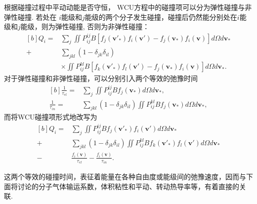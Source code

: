 根据碰撞过程中平动动能是否守恒， WCU方程中的碰撞项可以分为弹性碰撞与非弹性碰撞. 若处在
$ i $能级和$ j $能级的两个分子发生碰撞，碰撞后仍然能分别处在$ i $能级和$ j $能级，则为弹性碰撞, 否则为非弹性碰撞：
\begin{equation*}\label{Chapter1_inelastic_elastic}
\begin{aligned}[b]
Q_i=&\sum_{j}\iint
P_{ij}^{ij}B
\left[f_j(\bm{v}'_{\ast})f_i(\bm{v}')-f_j(\bm{v}_{\ast})f_i(\bm{v})\right]d\Omega
d\bm{v}_\ast\\
+&\sum_{jkl}(1-\delta_{jk}\delta_{il})\\
&\times\iint
P_{ij}^{kl}B
\left[f_k(\bm{v}'_{\ast})f_l(\bm{v}')-f_j(\bm{v}_{\ast})f_i(\bm{v})\right]d\Omega
d\bm{v}_\ast.
\end{aligned}
\end{equation*}
对于弹性碰撞和非弹性碰撞，可以分别引入两个等效的弛豫时间\cite{Morse1964}
\begin{equation*}
\begin{aligned}[b]
\frac{1}{\tau_{el}}=&\sum_{j}\iint
P_{ij}^{ij}B
f_j(\bm{v}_{\ast})d\Omega
d\bm{v}_\ast, \\
\frac{1}{\tau_{in}}=&\sum_{jkl}(1-\delta_{jk}\delta_{il})\iint
P_{ij}^{kl}B
f_j(\bm{v}_{\ast})d\Omega
d\bm{v}_\ast,
\end{aligned}
\end{equation*}
而将WCU碰撞项形式地改写为
\begin{equation*}
\begin{aligned}[b]
Q_i=&\sum_{j}\iint
P_{ij}^{ij}B
f_j(\bm{v}'_{\ast})f_i(\bm{v}')d\Omega
d\bm{v}_\ast
\\
+&\sum_{jkl}(1-\delta_{jk}\delta_{il})\iint
P_{ij}^{kl}B f_k(\bm{v}'_{\ast})f_l(\bm{v}')d\Omega
d\bm{v}_\ast\\
-&\frac{f_i(\bm{v})}{\tau_{el}}-\frac{f_i(\bm{v})}{\tau_{in}}.
\end{aligned}
\end{equation*}


%

这两个等效的碰撞时间，表征着能量在各种自由度或能级间的弛豫速度，因而与下面将讨论的分子气体输运系数，体积粘性和平动、转动热导率等，有着直接的关联. 

